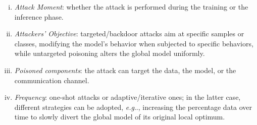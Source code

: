 \documentclass[conference]{IEEEtran}
\makeatletter
\DeclareRobustCommand\onedot{\futurelet\@let@token\@onedot}
\def\@onedot{\ifx\@topicslet@token.\else.\null\fi\xspace}
\def\eg{\emph{e.g}\onedot} \def\Eg{\emph{E.g}\onedot}
\makeatother
\begin{document}
\begin{enumerate}[(i)]
\item \emph{Attack Moment}: whether the attack is performed during the training or the inference phase.

\item \emph{Attackers' Objective}: targeted/backdoor attacks aim at specific samples or classes, modifying the model's behavior when subjected to specific behaviors, while untargeted poisoning alters the global model uniformly.

\item \emph{Poisoned components}: the attack can target the data, the model, or the communication channel.

\item \emph{Frequency}: one-shot attacks or adaptive/iterative ones; in the latter case, different strategies can be adopted, \eg, increasing the percentage data over time to slowly divert the global model of its original local optimum.
\end{enumerate}



    
    
\end{document}

